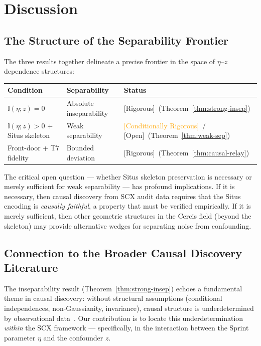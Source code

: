 \documentclass[12pt,a4paper]{article}
\newcommand{\rigorous}{\textcolor{green!50!black}{\small\textsf{[Rigorous]}}}
\newcommand{\conditionallyrigorous}{\textcolor{orange}{\small\textsf{[Conditionally Rigorous]}}}
\newcommand{\openquest}{\textcolor{red!70!black}{\small\textsf{[Open]}}}
\newcommand{\I}{\mathbb{I}}
\begin{document}
\section{Discussion}

\subsection{The Structure of the Separability Frontier}

The three results together delineate a precise frontier in the space of
$\eta$--$z$ dependence structures:

\begin{center}
\begin{tabular}{@{}lll@{}}
\toprule
\textbf{Condition} & \textbf{Separability} & \textbf{Status} \\
\midrule
$\I(\eta; z) = 0$ & Absolute inseparability & \rigorous~(Theorem~\ref{thm:strong-insep}) \\
$\I(\eta; z) > 0$ + Situs skeleton & Weak separability & \conditionallyrigorous~/
\openquest~(Theorem~\ref{thm:weak-sep}) \\
Front-door + T7 fidelity & Bounded deviation & \rigorous~(Theorem~\ref{thm:causal-relay}) \\
\bottomrule
\end{tabular}
\end{center}

The critical open question — whether Situs skeleton preservation is necessary or
merely sufficient for weak separability — has profound implications.  If it is
necessary, then causal discovery from SCX audit data requires that the Situs
encoding is \emph{causally faithful}, a property that must be verified
empirically.  If it is merely sufficient, then other geometric structures in
the Cercis field (beyond the skeleton) may provide alternative wedges for
separating noise from confounding.

\subsection{Connection to the Broader Causal Discovery Literature}

The inseparability result (Theorem~\ref{thm:strong-insep}) echoes a fundamental
theme in causal discovery: without structural assumptions (conditional
independences, non-Gaussianity, invariance), causal structure is
underdetermined by observational data~\citep{spirtes2000causation}.  Our
contribution is to locate this underdetermination \emph{within} the SCX
framework — specifically, in the interaction between the Sprint parameter
$\eta$ and the confounder $z$.
\end{document}
